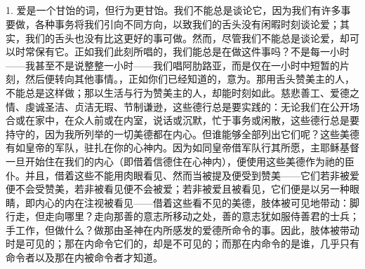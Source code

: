 \subsection{}

\par

1. 爱是一个甘饴的词，但行为更甘饴。我们不能总是谈论它，因为我们有许多事要做，各种事务将我们引向不同方向，以致我们的舌头没有闲暇时刻谈论爱；其实，我们的舌头也没有比这更好的事可做。然而，尽管我们不能总是谈论爱，却可以时常保有它。正如我们此刻所唱的，我们能总是在做这件事吗？不是每一小时——我甚至不是说整整一小时——我们唱阿肋路亚，而是仅在一小时中短暂的片刻，然后便转向其他事情。，正如你们已经知道的，意为。那用舌头赞美主的人，不能总是这样做；那以生活与行为赞美主的人，却能时刻如此。慈悲善工、爱德之情、虔诚圣洁、贞洁无瑕、节制谦逊，这些德行总是要实践的：无论我们在公开场合或在家中，在众人前或在内室，说话或沉默，忙于事务或闲散，这些德行总是要持守的，因为我所列举的一切美德都在内心。但谁能够全部列出它们呢？这些美德有如皇帝的军队，驻扎在你的心神内。因为如同皇帝借军队行其所愿，主耶稣基督一旦开始住在我们的内心（即借着信德住在心神内），便使用这些美德作为祂的臣仆。并且，借着这些不能用肉眼看见、然而当被提及便受到赞美——它们若非被爱便不会受赞美，若非被看见便不会被爱；若非被爱且被看见，它们便是以另一种眼睛，即内心的内在注视被看见——借着这些看不见的美德，肢体被可见地带动：脚行走，但走向哪里？走向那善的意志所移动之处，善的意志犹如服侍善君的士兵；手工作，但做什么？做那由圣神在内所感发的爱德所命令的事。因此，肢体被带动时是可见的；那在内命令它们的，却是不可见的；而那在内命令的是谁，几乎只有命令者以及那在内被命令者才知道。\par

